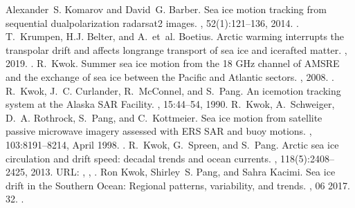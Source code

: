 \documentclass[letterpaper,10pt,english]{jupyterBook}
\begin{document}
\begin{sphinxthebibliography}{10}
\sphinxAtStartPar
Alexander S. Komarov and David G. Barber. Sea ice motion tracking from sequential dual\sphinxhyphen{}polarization radarsat\sphinxhyphen{}2 images. , 52(1):121–136, 2014. .
\sphinxAtStartPar
T. Krumpen, H.J. Belter, and A. et al. Boetius. Arctic warming interrupts the transpolar drift and affects long\sphinxhyphen{}range transport of sea ice and ice\sphinxhyphen{}rafted matter. , 2019. .
\sphinxAtStartPar
R. Kwok. Summer sea ice motion from the 18 GHz channel of AMSR\sphinxhyphen{}E and the exchange of sea ice between the Pacific and Atlantic sectors. , 2008. .
\sphinxAtStartPar
R. Kwok, J. C. Curlander, R. McConnel, and S. Pang. An ice\sphinxhyphen{}motion tracking system at the Alaska SAR Facility. , 15:44–54, 1990.
\sphinxAtStartPar
R. Kwok, A. Schweiger, D. A. Rothrock, S. Pang, and C. Kottmeier. Sea ice motion from satellite passive microwave imagery assessed with ERS SAR and buoy motions. , 103:8191–8214, April 1998. .
\sphinxAtStartPar
R. Kwok, G. Spreen, and S. Pang. Arctic sea ice circulation and drift speed: decadal trends and ocean currents. , 118(5):2408–2425, 2013. URL: , , .
\sphinxAtStartPar
Ron Kwok, Shirley S. Pang, and Sahra Kacimi. Sea ice drift in the Southern Ocean: Regional patterns, variability, and trends. , 06 2017. 32. .

\end{sphinxthebibliography}
\end{document}
